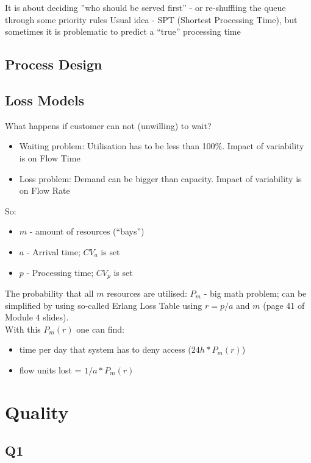 \documentclass{scrartcl}
\begin{document}
It is about deciding ''who should be served first'' - or re-shuffling the queue through some priority rules
Usual idea - SPT (Shortest Processing Time), but sometimes it is problematic to predict a ``true'' processing time

\subsection{Process Design}
\label{sec:06-06}


\subsection{Loss Models}
\label{sec:06-07}

What happens if customer can not (unwilling) to wait?
\begin{itemize}
\item Waiting problem: Utilisation has to be less than 100\%. Impact of variability is on Flow Time
\item Loss problem: Demand can be bigger than capacity. Impact of variability is on Flow Rate
\end{itemize}

So:
\begin{itemize}
\item $m$ - amount of resources (``bays'')
\item $a$ - Arrival time; $CV_a$ is set
\item $p$ - Processing time; $CV_p$ is set
\end{itemize}

The probability that all $m$ resources are utilised: $P_m$ - big math problem; can be simplified by using so-called Erlang Loss Table using $r=p / a$ and $m$ (page 41 of Module 4 slides).\\
With this $P_m(r)$ one can find:
\begin{itemize}
\item time per day that system has to deny access ($24h * P_m(r)$)
\item flow units lost = $1 / a * P_m(r)$
\end{itemize}

\section{Quality}
\label{sec:07}

\subsection{Q1}
\label{sec:07-01}
\end{document}
